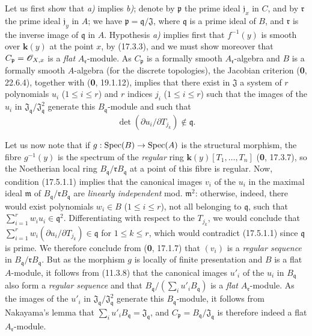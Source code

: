 Let us first show that \emph{a)} implies \emph{b)}; denote by $\mathfrak p$ the prime ideal $\mathfrak j_x$ in $C$, and by $\mathfrak r$ the prime ideal $\mathfrak j_y$ in $A$; we have $\mathfrak p=\mathfrak q/\mathfrak J$, where $\mathfrak q$ is a prime ideal of $B$, and $\mathfrak r$ is the inverse image of $\mathfrak q$ in $A$. Hypothesis \emph{a)} implies first that $f^{-1}(y)$ is smooth over $\boldsymbol{k}(y)$ at the point $x$, by (17.3.3), and we must show moreover that $C_{\mathfrak p}=\mathscr{O}_{X,x}$ is a \emph{flat} $A_{\mathfrak r}$-module. As $C_{\mathfrak p}$ is a formally smooth $A_{\mathfrak r}$-algebra and $B$ is a formally smooth $A$-algebra (for the discrete topologies), the Jacobian criterion (\textbf{0}, 22.6.4), together with (\textbf{0}, 19.1.12), implies that there exist in $\mathfrak J$ a system of $r$ polynomials $u_i$ ($1\leq i\leq r$) and $r$ indices $j_i$ ($1\leq i\leq r$) such that the images of the $u_i$ in $\mathfrak J_{\mathfrak q}/\mathfrak J_{\mathfrak q}^2$ generate this $B_{\mathfrak q}$-module and such that
\[
\label{IV.17.5.1.1}
\det(\partial u_i/\partial T_{j_k})\notin\mathfrak q.
\tag{17.5.1.1}
\]

Let us now note that if $g:\operatorname{Spec}(B)\to\operatorname{Spec}(A)$ is the structural morphism, the fibre $g^{-1}(y)$ is the spectrum of the \emph{regular} ring $\boldsymbol{k}(y)[T_1,\ldots,T_n]$ (\textbf{0}, 17.3.7), so the Noetherian local ring $B_{\mathfrak q}/\mathfrak rB_{\mathfrak q}$ at a point of this fibre is regular. Now, condition (17.5.1.1) implies that the canonical images $v_i$ of the $u_i$ in the maximal ideal $\mathfrak m$ of $B_{\mathfrak q}/\mathfrak rB_{\mathfrak q}$ are \emph{linearly independent} mod. $\mathfrak m^2$: otherwise, indeed, there would exist polynomials $w_i\in B$ ($1\leq i\leq r$), not all belonging to $\mathfrak q$, such that $\sum_{i=1}^r w_i u_i\in\mathfrak q^2$. Differentiating with respect to the $T_{j_k}$, we would conclude that $\sum_{i=1}^r w_i(\partial u_i/\partial T_{j_k})\in\mathfrak q$ for $1\leq k\leq r$, which would contradict (17.5.1.1) since $\mathfrak q$ is prime. We therefore conclude from (\textbf{0}, 17.1.7) that $(v_i)$ is a \emph{regular sequence} in $B_{\mathfrak q}/\mathfrak rB_{\mathfrak q}$. But as the morphism $g$ is locally of finite presentation and $B$ is a flat $A$-module, it follows from (11.3.8) that the canonical images $u'_i$ of the $u_i$ in $B_{\mathfrak q}$ also form a \emph{regular sequence} and that $B_{\mathfrak q}/(\sum_i u'_iB_{\mathfrak q})$ is a \emph{flat} $A_{\mathfrak r}$-module. As the images of the $u'_i$ in $\mathfrak J_{\mathfrak q}/\mathfrak J_{\mathfrak q}^2$ generate this $B_{\mathfrak q}$-module, it follows from Nakayama's lemma that $\sum_i u'_iB_{\mathfrak q}=\mathfrak J_{\mathfrak q}$, and $C_{\mathfrak p}=B_{\mathfrak q}/\mathfrak J_{\mathfrak q}$ is therefore indeed a flat $A_{\mathfrak r}$-module.

